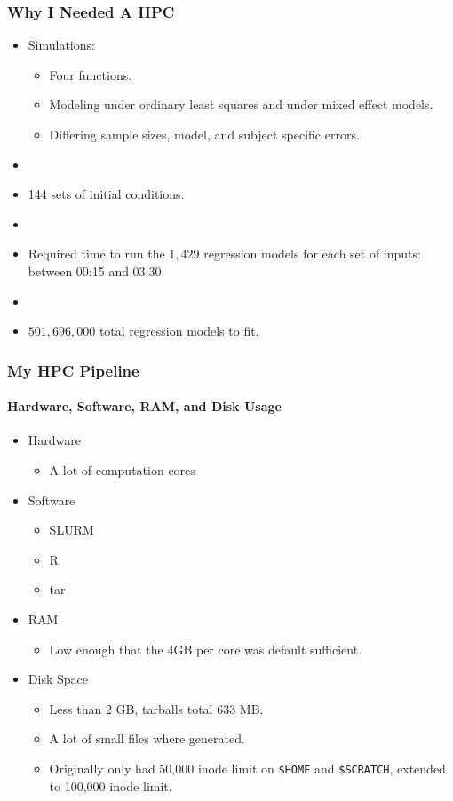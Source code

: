 \documentclass[10pt]{beamer}
\begin{document}
\begin{frame}
  \frametitle{Why I Needed A HPC}
  \begin{itemize}
    \item Simulations:
      \begin{itemize}
        \item Four functions.
        \item Modeling under ordinary least squares and under mixed effect models.
        \item Differing sample sizes, model, and subject specific errors.
      \end{itemize}
    \item[]
    \item 144 sets of initial conditions.
    \item[]
    \item Required time to run the $1,429$ regression models for each set of
      inputs: between 00:15 and 03:30.
    \item[]
    \item $501,696,000$ total regression models to fit.
  \end{itemize}
\end{frame}

\begin{frame}
  \frametitle{My HPC Pipeline}
  \framesubtitle{Hardware, Software, RAM, and Disk Usage}
  \begin{itemize}
    \item Hardware
      \begin{itemize}
        \item A lot of computation cores
      \end{itemize}

    \item Software
      \begin{itemize}
        \item SLURM
        \item R
        \item tar
      \end{itemize}

    \item RAM
      \begin{itemize}
        \item Low enough that the 4GB per core was default sufficient.
      \end{itemize}

    \item Disk Space
      \begin{itemize}
        \item Less than 2 GB, tarballs total 633 MB.
        \item A lot of small files where generated.
        \item Originally only had 50,000 inode limit on {\tt \$HOME} and
          {\tt \$SCRATCH}, extended to 100,000 inode limit.
      \end{itemize}
  \end{itemize} 
\end{frame}
\end{document}
